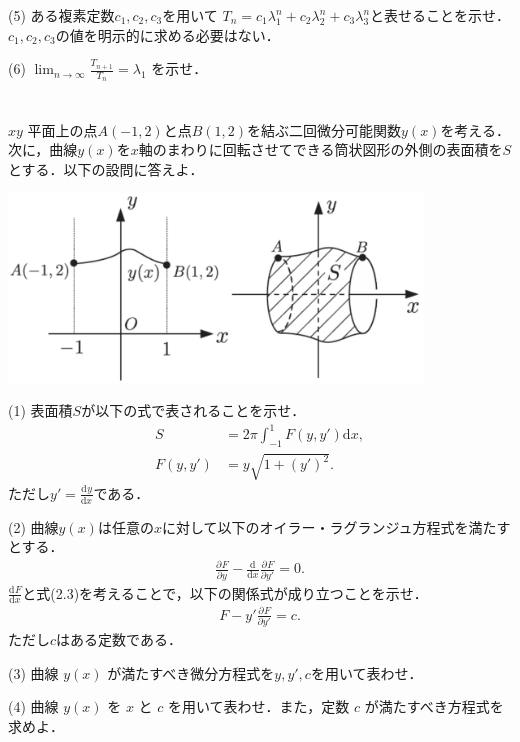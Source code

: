 \documentclass[a4j]{jarticle}
\let \ds \displaystyle
\newcommand{\diff}[3]{
  \frac{\mathrm{d}^{#1} #2}{\mathrm{d} #3^{#1}}
}
\newcommand{\pdiff}[3]{
  \frac{\partial^{#1} #2}{\partial #3^{#1}}
}
\begin{document}
\begin{screen}
 (5) ある複素定数$c_1,c_2,c_3$を用いて $T_n = c_1\lambda_1^n+c_2\lambda_2^n+c_3\lambda_3^n$と表せることを示せ．$c_1,c_2,c_3$の値を明示的に求める必要はない．
\end{screen}

\begin{screen}
 (6) $\ds \lim_{n \rightarrow \infty} \frac{T_{n+1}}{T_n} = \lambda_1$ を示せ．
\end{screen}
\section{}

\begin{screen}
 $xy$ 平面上の点$A(-1,2)$と点$B(1,2)$を結ぶ二回微分可能関数$y(x)$を考える．次に，曲線$y(x)$を$x$軸のまわりに回転させてできる筒状図形の外側の表面積を$S$とする．以下の設問に答えよ．
 
 \centering\includegraphics[width=11cm]{figure_2016_01.png}
\end{screen}

\begin{screen}
 (1) 表面積$S$が以下の式で表されることを示せ．
 \begin{align*}
  S &= 2 \pi \int_{-1}^1 F(y,y') \mathrm{d}x,\tag{2.1} \\
  F(y,y') &=y \sqrt{ 1 + \left(y'\right)^2}. \tag{2.2}
 \end{align*}
 ただし$\ds y' = \diff{}{y}{x}$である．
\end{screen}

\begin{screen}
 (2) 曲線$y(x)$は任意の$x$に対して以下のオイラー・ラグランジュ方程式を満たすとする．
 \begin{align*}
  \pdiff{}{F}{y} - \diff{}{}{x}\pdiff{}{F}{y'} = 0. \tag{2.3}
 \end{align*}
 $\ds \diff{}{F}{x}$と式(2.3)を考えることで，以下の関係式が成り立つことを示せ．
 \begin{align*}
  F - y'\pdiff{}{F}{y'} = c. \tag{2.4}
 \end{align*}
 ただし$c$はある定数である．
\end{screen}

\begin{screen}
 (3) 曲線 $y(x)$ が満たすべき微分方程式を$y,y',c$を用いて表わせ．
\end{screen}


\begin{screen}
 (4) 曲線 $y(x)$ を $x$ と $c$ を用いて表わせ．また，定数 $c$ が満たすべき方程式を求めよ．
\end{screen}

\section{}
\end{document}

